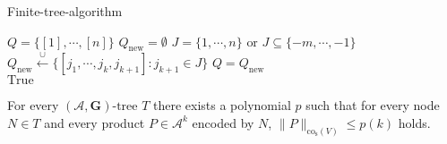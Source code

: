\vspace{1cm}

\begin{algorithm}[h]
    \caption{Finite-tree-algorithm}
    \label{alg:tree}
    \begin{algorithmic}
        \State $Q = \{[1], \cdots, [n]\}$
            \State $Q_{\text{new}} = \emptyset$
                    \State $J = \{1, \cdots, n\} \text{ or } J \subseteq \{-m, \cdots, -1\}$
                    \State $Q_{\text{new}} \xleftarrow{\cup} \{[j_1,\cdots,j_k,j_{k+1}]: j_{k+1} \in J\}$
                \EndIf
            \EndFor
            \State $Q = Q_{\text{new}}$
        \EndWhile \\
        \Return $\text{True}$
    \end{algorithmic}
  \end{algorithm}

\vspace{3cm}

\begin{lemma}
    \label{lem:poly_bound}
    For every $(\mathcal{A},\mathbf{G})\text{-tree } T$ there exists a polynomial $p$ such that for every node $N \in T$ and every product $P \in \mathcal{A}^k$ encoded by $N$, $\lVert P \rVert _{\text{co}_{\text{s}}(V)} \le p(k)$ holds.
\end{lemma}
  
